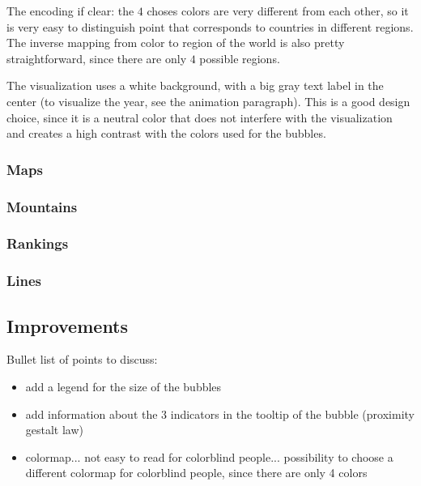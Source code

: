 The encoding if clear: the $4$ choses colors are very different from each other, so it is very easy to distinguish point that corresponds to countries in different regions.
The inverse mapping from color to region of the world is also pretty straightforward, since there are only $4$ possible regions.

The visualization uses a white background, with a big gray text label in the center (to visualize the year, see the animation paragraph).
This is a good design choice, since it is a neutral color that does not interfere with the visualization and creates a high contrast with the colors used for the bubbles.



\subsubsection{Maps}

\subsubsection{Mountains}

\subsubsection{Rankings}

\subsubsection{Lines}


\subsection{Improvements}
Bullet list of points to discuss:
\begin{itemize}
    \item add a legend for the size of the bubbles
    \item add information about the 3 indicators in the tooltip of the bubble (proximity gestalt law)

    \item colormap... not easy to read for colorblind people... possibility to choose a different colormap for colorblind people, since there are only 4 colors
\end{itemize}
